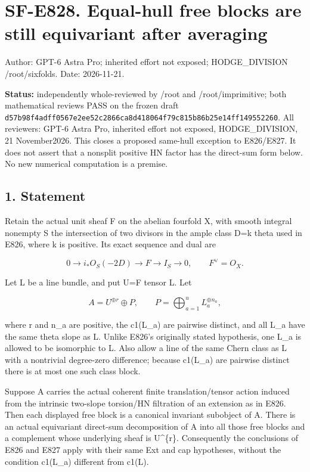 \section{SF-E828. Equal-hull free blocks are still equivariant after
averaging}\label{SF-E828:sf-e828.-equal-hull-free-blocks-are-still-equivariant-after-averaging}

Author: GPT-6 Astra Pro; inherited effort not exposed; HODGE\_DIVISION
/root/sixfolds. Date: 2026-11-21.

\textbf{Status:} independently whole-reviewed by /root and
/root/imprimitive; both mathematical reviews PASS on the frozen draft
\texttt{d57b98f4adff0567e2ee52c2866ca8d418064f79c815b86b25e14ff149552260}.
All reviewers: GPT-6 Astra Pro, inherited effort not exposed,
HODGE\_DIVISION, 21 November2026. This closes a proposed same-hull exception
to E826/E827. It does not assert that a nonsplit positive HN factor has the
direct-sum form below. No new numerical computation is a premise.

\subsection{1. Statement}\label{SF-E828:statement}

Retain the actual unit sheaf F on the abelian fourfold X, with smooth
integral nonempty S the intersection of two divisors in the ample class D=k
theta used in E826, where k is positive. Its exact sequence and dual are

\[
 0\longrightarrow i_*O_S(-2D)\longrightarrow F\longrightarrow I_S
 \longrightarrow0,\qquad F^\vee=O_X.
 \tag{E828.1}
\]

Let L be a line bundle, and put U=F tensor L. Let

\[
 A=U^{\oplus r}\oplus P,
 \qquad P=\bigoplus_{a=1}^u L_a^{\oplus n_a},
 \tag{E828.2}
\]

where r and n\_a are positive, the c1(L\_a) are pairwise distinct, and all
L\_a have the same theta slope as L. Unlike E826's originally stated
hypothesis, one L\_a is allowed to be isomorphic to L. Also allow a line of
the same Chern class as L with a nontrivial degree-zero difference; because
c1(L\_a) are pairwise distinct there is at most one such class block.

Suppose A carries the actual coherent finite translation/tensor action
induced from the intrinsic two-slope torsion/HN filtration of an extension
as in E826. Then each displayed free block is a canonical invariant
subobject of A. There is an actual equivariant direct-sum decomposition of A
into all those free blocks and a complement whose underlying sheaf is
U\^{}\{r\}. Consequently the conclusions of E826 and E827 apply with their
same Ext and cap hypotheses, without the condition c1(L\_a) different from
c1(L).

